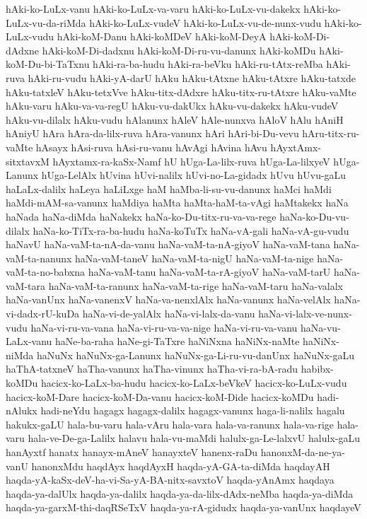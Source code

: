 {hAki-ko-LuLx-vanu
hAki-ko-LuLx-va-varu
hAki-ko-LuLx-vu-dakekx
hAki-ko-LuLx-vu-da-riMda
hAki-ko-LuLx-vudeV
hAki-ko-LuLx-vu-de-nunx-vudu
hAki-ko-LuLx-vudu
hAki-koM-Danu
hAki-koMDeV
hAki-koM-DeyA
hAki-koM-Di-dAdxne
hAki-koM-Di-dadxnu
hAki-koM-Di-ru-vu-danunx
hAki-koMDu
hAki-koM-Du-bi-TaTxnu
hAki-ra-ba-hudu
hAki-ra-beVku
hAki-ru-tAtx-reMba
hAki-ruva
hAki-ru-vudu
hAki-yA-darU
hAku
hAku-tAtxne
hAku-tAtxre
hAku-tatxde
hAku-tatxleV
hAku-tetxVve
hAku-titx-dAdxre
hAku-titx-ru-tAtxre
hAku-vaMte
hAku-varu
hAku-va-va-regU
hAku-vu-dakUkx
hAku-vu-dakekx
hAku-vudeV
hAku-vu-dilalx
hAku-vudu
hAlanunx
hAleV
hAle-nunxva
hAloV
hAlu
hAniH
hAniyU
hAra
hAra-da-lilx-ruva
hAra-vanunx
hAri
hAri-bi-Du-vevu
hAru-titx-ru-vaMte
hAsayx
hAsi-ruva
hAsi-ru-vanu
hAvAgi
hAvina
hAvu
hAyxtAmx-sitxtavxM
hAyxtamx-ra-kaSx-Namf
hU
hUga-La-lilx-ruva
hUga-La-lilxyeV
hUga-Lanunx
hUga-LelAlx
hUvina
hUvi-nalilx
hUvi-no-La-gidadx
hUvu
hUvu-gaLu
haLaLx-dalilx
haLeya
haLiLxge
haM
haMba-li-su-vu-danunx
haMci
haMdi
haMdi-mAM-sa-vanunx
haMdiya
haMta
haMta-haM-ta-vAgi
haMtakekx
haNa
haNada
haNa-diMda
haNakekx
haNa-ko-Du-titx-ru-va-va-rege
haNa-ko-Du-vu-dilalx
haNa-ko-TiTx-ra-ba-hudu
haNa-koTuTx
haNa-vA-gali
haNa-vA-gu-vudu
haNavU
haNa-vaM-ta-nA-da-vanu
haNa-vaM-ta-nA-giyoV
haNa-vaM-tana
haNa-vaM-ta-nanunx
haNa-vaM-taneV
haNa-vaM-ta-nigU
haNa-vaM-ta-nige
haNa-vaM-ta-no-babxna
haNa-vaM-tanu
haNa-vaM-ta-rA-giyoV
haNa-vaM-tarU
haNa-vaM-tara
haNa-vaM-ta-ranunx
haNa-vaM-ta-rige
haNa-vaM-taru
haNa-valalx
haNa-vanUnx
haNa-vanenxV
haNa-va-nenxlAlx
haNa-vanunx
haNa-velAlx
haNa-vi-dadx-rU-kuDa
haNa-vi-de-yalAlx
haNa-vi-lalx-da-vanu
haNa-vi-lalx-ve-nunx-vudu
haNa-vi-ru-va-vana
haNa-vi-ru-va-va-nige
haNa-vi-ru-va-vanu
haNa-vu-LaLx-vanu
haNe-ba-raha
haNe-gi-TaTxre
haNiNxna
haNiNx-naMte
haNiNx-niMda
haNuNx
haNuNx-ga-Lanunx
haNuNx-ga-Li-ru-vu-danUnx
haNuNx-gaLu
haThA-tatxneV
haTha-vanunx
haTha-vinunx
haTha-vi-ra-bA-radu
habibx-koMDu
hacicx-ko-LaLx-ba-hudu
hacicx-ko-LaLx-beVkeV
hacicx-ko-LuLx-vudu
hacicx-koM-Dare
hacicx-koM-Da-vanu
hacicx-koM-Dide
hacicx-koMDu
hadi-nAlukx
hadi-neYdu
hagagx
hagagx-dalilx
hagagx-vanunx
haga-li-nalilx
hagalu
hakukx-gaLU
hala-bu-varu
hala-vAru
hala-vara
hala-va-ranunx
hala-va-rige
hala-varu
hala-ve-De-ga-Lalilx
halavu
hala-vu-maMdi
halulx-ga-Le-lalxvU
halulx-gaLu
hanAyxtf
hanatx
hanayx-mAneV
hanayxteV
hanenx-raDu
hanonxM-da-ne-ya-vanU
hanonxMdu
haqdAyx
haqdAyxH
haqda-yA-GA-ta-diMda
haqdayAH
haqda-yA-kaSx-deV-ha-vi-Sa-yA-BA-nitx-savxtoV
haqda-yAnAmx
haqdaya
haqda-ya-dalUlx
haqda-ya-dalilx
haqda-ya-da-lilx-dAdx-neMba
haqda-ya-diMda
haqda-ya-garxM-thi-daqRSeTxV
haqda-ya-rA-gidudx
haqda-ya-vanUnx
haqdayeV
}
